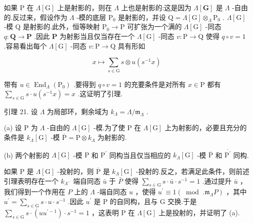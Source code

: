 \documentclass[10pt]{article}
\begin{document}
如果 \(\mathrm{P}\) 在 \(\Lambda \left\lbrack  \mathrm{G}\right\rbrack\) 上是射影的，则在 \(\Lambda\) 上也是射影的:这是因为 \(\Lambda \left\lbrack  \mathbf{G}\right\rbrack\) 是 \(\Lambda\) -自由的.反过来，假设作为 \(\Lambda\) -模的底层 \({\mathrm{P}}_{0}\) 是射影的，并设 \(\mathrm{Q} = \Lambda \left\lbrack  \mathrm{G}\right\rbrack  { \otimes  }_{\Lambda }{\mathrm{P}}_{0}\) . \(\Lambda \left\lbrack  \mathrm{G}\right\rbrack\) -模 \(\mathrm{Q}\) 是射影的.此外，恒等映射 \({\mathrm{P}}_{0} \rightarrow  \mathrm{P}\) 可扩张为一个满的 \(\Lambda \left\lbrack  \mathrm{G}\right\rbrack\) -同态 \(q : \mathbf{Q} \rightarrow  \mathbf{P}\) .因此 \(\mathbf{P}\) 为射影当且仅当存在一个 \(\Lambda \left\lbrack  \mathrm{G}\right\rbrack\) -同态 \(v : \mathrm{P} \rightarrow  \mathrm{Q}\) 使得 \(q \circ  v = 1\) .容易看出每个 \(\Lambda \left\lbrack  \mathrm{G}\right\rbrack\) -同态 \(v : \mathrm{P} \rightarrow  \mathrm{Q}\) 具有形如

\[
x \mapsto  \mathop{\sum }\limits_{{s \in  \mathrm{G}}}s \otimes  u\left( {{s}^{-1}x}\right)
\]

带有 \(u \in  {\operatorname{End}}_{\Lambda }\left( {\mathrm{P}}_{0}\right)\) .要得到 \(q \circ  v = 1\) 的充要条件是对所有 \(x \in  \mathrm{P}\) 都有 \(\mathop{\sum }\limits_{{s \in  \mathrm{G}}}s \cdot  u\left( {{s}^{-1}x}\right)  = x\) .这证明了引理.

引理 21. 设 \(\Lambda\) 为局部环，剩余域为 \({k}_{\Lambda } = \Lambda /{\mathfrak{m}}_{\Lambda }\) .

(a) 设 \(\mathrm{P}\) 为 \(\Lambda\) -自由的 \(\Lambda \left\lbrack  \mathrm{G}\right\rbrack\) -模.为了使 \(\mathrm{P}\) 在 \(\Lambda \left\lbrack  \mathrm{G}\right\rbrack\) 上为射影的，必要且充分的条件是 \({k}_{\Lambda }\left\lbrack  \mathrm{G}\right\rbrack\) -模 \(\overline{\mathrm{P}} = \mathrm{P} \otimes  {k}_{\Lambda }\) 为射影的.

(b) 两个射影的 \(\Lambda \left\lbrack  \mathrm{G}\right\rbrack\) -模 \(\mathrm{P}\) 和 \({\mathrm{P}}^{\prime }\) 同构当且仅当相应的 \({k}_{\Lambda }\left\lbrack  \mathrm{G}\right\rbrack\) -模 \(\overline{\mathrm{P}}\) 和 \(\overline{{\mathrm{P}}^{\prime }}\) 同构.

如果 \(\mathrm{P}\) 是 \(\Lambda \left\lbrack  \mathrm{G}\right\rbrack\) -投射的，则 \(\overline{\mathrm{P}}\) 是 \({k}_{\Lambda }\left\lbrack  \mathrm{G}\right\rbrack\) -投射的.反之，若满足此条件，则前述引理表明存在一个 \({k}_{{\Lambda }^{ - }}\) 端自同态 \(\bar{u}\) 于 \(\bar{P}\) 使得 \(\mathop{\sum }\limits_{{s \in  \mathrm{G}}}s \cdot  \bar{u} \cdot  {s}^{-1} = 1\) .通过提升 \(\bar{u}\) ，我们得到一个作用在 \(P\) 上的 \(\Lambda\) -端自同态 \(u\) ，使得 \({u}^{\prime } \equiv  1\left( {{\;\operatorname{mod}\;.}{\mathfrak{m}}_{\Lambda }P}\right)\) ，其中 \({u}^{\prime } = \mathop{\sum }\limits_{{s \in  \mathrm{G}}}s \cdot  u \cdot  {s}^{-1}\) .因此 \({u}^{\prime }\) 是 \(\mathrm{P}\) 的自同构，且与 G 交换.于是 \(\mathop{\sum }\limits_{{s \in  \mathrm{G}}}s \cdot  \left( {u{u}^{\prime  - 1}}\right)  \cdot  {s}^{-1} = 1\) ，这表明 \(\mathrm{P}\) 在 \(\Lambda \left\lbrack  \mathrm{G}\right\rbrack\) 上是投射的，并证明了 (a).
\end{document}
